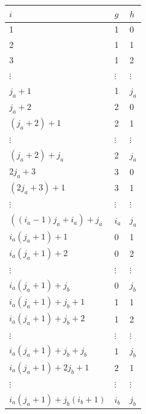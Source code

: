 \documentclass{article}
\begin{document}
\begin{center} \begin{tabular}{|p{1.0in}|p{0.2in}|p{0.2in}|} \hline 
    $i$ & $g$ & $h$ \\ \hline 
    1 & 1 & 0 \\ \hline 
    2 & 1 & 1 \\ \hline 
    3 & 1 & 2 \\ \hline 
    $\vdots $ & $\vdots $ & $\vdots $ \\ \hline 
    $j_{a} +1$ & 1 & $j_{a} $ \\ \hline 
    $j_{a} +2$ & 2 & 0 \\ \hline 
    $\left(j_{a} +2\right)+1$ & 2 & 1 \\ \hline 
    $\vdots $ & $\vdots $ & $\vdots $ \\ \hline 
    $\left(j_{a} +2\right)+j_{a} $ & 2 & $j_{a} $ \\ \hline 
    $2j_{a} +3$ & 3 & 0 \\ \hline 
    $\left(2j_{a} +3\right)+1$ & 3 & 1 \\ \hline 
    $\vdots $ & $\vdots $ & $\vdots $ \\ \hline 
    $\left(\left(i_{a} -1\right)j_{a} +i_{a} \right)+j_{a} $ & $i_{a} $ & $j_{a} $
    \\ \hline
    $i_{a} \left(j_{a} +1\right)+1$ & 0 & 1 \\ \hline 
    $i_{a} \left(j_{a} +1\right)+2$ & 0 & 2 \\ \hline 
    $\vdots $ & $\vdots $ & $\vdots $ \\ \hline 
    $i_{a} \left(j_{a} +1\right)+j_{b} $ & 0 & $j_{b} $ \\ \hline 
    $i_{a} \left(j_{a} +1\right)+j_{b} +1$ & 1 & 1 \\ \hline 
    $i_{a} \left(j_{a} +1\right)+j_{b} +2$ & 1 & 2 \\ \hline 
    $\vdots $ & $\vdots $ & $\vdots $ \\ \hline 
    $i_{a} \left(j_{a} +1\right)+j_{b} +j_{b} $ & 1 & $j_{b} $ \\ \hline 
    $i_{a} \left(j_{a} +1\right)+2j_{b} +1$ & 2 & 1 \\ \hline 
    $\vdots $ & $\vdots $ & $\vdots $ \\ \hline 
    $i_{a} \left(j_{a} +1\right)+j_{b} \left(i_{b} +1\right)$ & $i_{b} $ & $j_{b} $
    \\ \hline
\end{tabular} \end{center}
\end{document}
